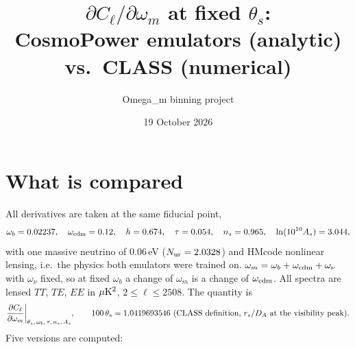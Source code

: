 \documentclass[10pt]{article}
\title{$\partial C_\ell/\partial\omega_m$ at fixed $\theta_s$:\\ CosmoPower emulators (analytic) vs.\ CLASS (numerical)}
\author{Omega\_m binning project}
\date{19 October 2026}
\newcommand{\om}{\omega_m}
\begin{document}
\maketitle

\section{What is compared}

All derivatives are taken at the same fiducial point,
\[
\omega_b=0.02237,\quad \omega_{\rm cdm}=0.12,\quad h=0.674,\quad \tau=0.054,\quad n_s=0.965,\quad \ln(10^{10}A_s)=3.044,
\]
with one massive neutrino of $0.06$\,eV ($N_{\rm ur}=2.0328$) and HMcode nonlinear lensing, i.e.\ the physics both
emulators were trained on. $\om=\omega_b+\omega_{\rm cdm}+\omega_\nu$ with $\omega_\nu$ fixed, so at fixed $\omega_b$ a
change of $\om$ is a change of $\omega_{\rm cdm}$. All spectra are lensed $TT$, $TE$, $EE$ in $\mu{\rm K}^2$,
$2\le\ell\le2508$. The quantity is
\begin{equation}
  \frac{\partial C_\ell}{\partial\om}\bigg|_{\theta_s,\,\omega_b,\,\tau,\,n_s,\,A_s},
  \qquad 100\,\theta_s = \thetafid \ \text{(CLASS definition, $r_s/D_A$ at the visibility peak).}
\end{equation}
Five versions are computed:
\end{document}
